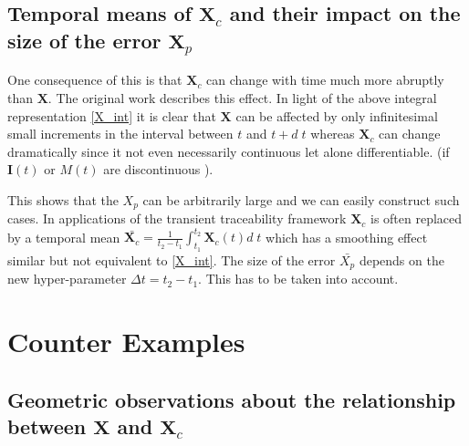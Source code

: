 \documentclass[journal abbreviation, manuscript]{copernicus}
\theoremstyle{definition}
\newcommand{\X}{\mathbf{X}}
\newcommand{\I}{\mathbf{I}}
\begin{document}
\subsection{Temporal means of $\X_c$ and their impact on the size of the error $\X_p$}

One consequence of this is that $\X_c$ can change with time much more abruptly than $\X$. 
The original work \citep[p. 152 Fig. 5]{Luo2017Biogeosciences} describes this effect. 
In light of the above integral representation \eqref{X_int} it is clear that
$\X$ can be affected by only infinitesimal small increments in the interval
between $t$ and $t+d\;t$ whereas $\X_c$ can change dramatically since it not even necessarily continuous let alone differentiable.
(if $\I(t)$ or $M(t)$ are discontinuous ).

This shows that the $X_p$ can be arbitrarily large and we can easily construct such cases.
In applications of the transient traceability framework $\X_c$ is often
replaced by a temporal mean $\bar{\X_c} = \frac{1}{t_2-t_1}\int_{t_1}^{t_2}
\X_c(t) d\;t$ which has a smoothing effect similar but not equivalent to \eqref{X_int}.
The size of the error $\bar{X_p}$ depends on the new hyper-parameter $\Delta t= t_2-t_1$.
This has to be taken into account.

\section{Counter Examples}
\label{sec:Examples}
\subsection{Geometric observations about the relationship between $\X$ and $\X_c$} 
\end{document}

